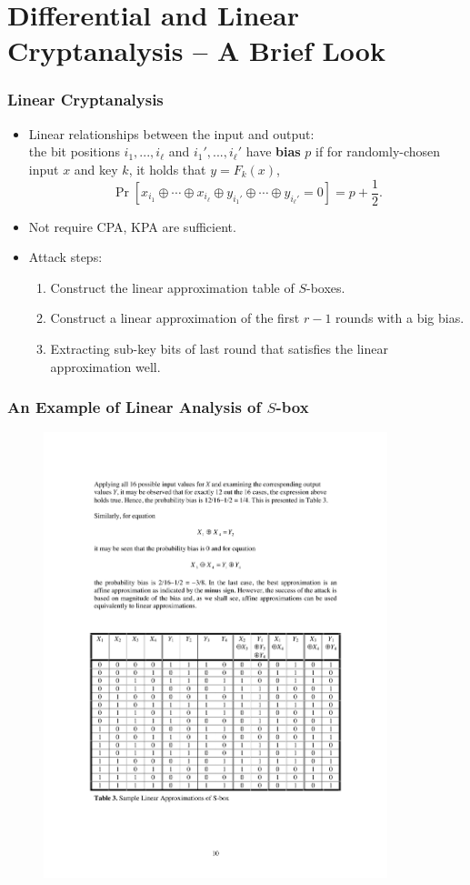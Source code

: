 \section{Differential and Linear Cryptanalysis -- A Brief Look}
\begin{frame}\frametitle{Linear Cryptanalysis}
\begin{itemize}
\item Linear relationships between the input and output: \\
the bit positions $i_1, ... ,i_\ell$ and $i_1', ... , i_\ell'$ have \textbf{bias} $p$ if for randomly-chosen input $x$ and key $k$, it holds that $y=F_k(x)$,
\[ \Pr [x_{i_1} \oplus \cdots \oplus x_{i_\ell} \oplus y_{i_1'} \oplus \cdots \oplus y_{i_\ell'} = 0] = p+\frac{1}{2}.
\]
\item Not require CPA, KPA are sufficient.
\item Attack steps:
\begin{enumerate}
\item Construct the linear approximation table of $S$-boxes.
\item Construct a linear approximation of the first $r-1$ rounds with a big bias.
\item Extracting sub-key bits of last round that satisfies the linear approximation well.
\end{enumerate}
\end{itemize}
\end{frame}
\begin{frame}\frametitle{An Example of Linear Analysis of $S$-box}
\begin{figure}
\begin{center}
\includegraphics[width=100mm]{pic/linear-sbox} 
\end{center}
\end{figure}
\end{frame}
